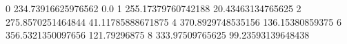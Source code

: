 0 234.73916625976562 0.0
1 255.17379760742188 20.43463134765625
2 275.8570251464844 41.11785888671875
4 370.8929748535156 136.15380859375
6 356.5321350097656 121.79296875
8 333.97509765625 99.23593139648438
